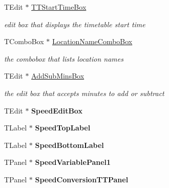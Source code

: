 \begin{DoxyCompactItemize}
T\+Edit $\ast$ \mbox{\hyperlink{class_t_interface_aa3e7a74c49f2afc9c61821f5606b13cd}{T\+T\+Start\+Time\+Box}}
\begin{DoxyCompactList}\small\item\em edit box that displays the timetable start time \end{DoxyCompactList}\item 
\mbox{\label{class_t_interface_a68191596344fa3f2f7c8b4feadb8ab4f}} 
T\+Combo\+Box $\ast$ \mbox{\hyperlink{class_t_interface_a68191596344fa3f2f7c8b4feadb8ab4f}{Location\+Name\+Combo\+Box}}
\begin{DoxyCompactList}\small\item\em the combobox that lists location names \end{DoxyCompactList}\item 
\mbox{\label{class_t_interface_abc16ad27bf676c2533855c4a092f43e4}} 
T\+Edit $\ast$ \mbox{\hyperlink{class_t_interface_abc16ad27bf676c2533855c4a092f43e4}{Add\+Sub\+Mins\+Box}}
\begin{DoxyCompactList}\small\item\em the edit box that accepts minutes to add or subtract \end{DoxyCompactList}\item 
\mbox{\label{class_t_interface_a4369dc729439dc084cf175080e2d0716}} 
T\+Edit $\ast$ {\bfseries Speed\+Edit\+Box}
\item 
\mbox{\label{class_t_interface_a08a62d0894da968f67d86b2f98961f2e}} 
T\+Label $\ast$ {\bfseries Speed\+Top\+Label}
\item 
\mbox{\label{class_t_interface_a6d01dde178e238e13a0762aba5415902}} 
T\+Label $\ast$ {\bfseries Speed\+Bottom\+Label}
\item 
\mbox{\label{class_t_interface_abed4d7ddeffcee538ecab4a508e28119}} 
T\+Panel $\ast$ {\bfseries Speed\+Variable\+Panel1}
\item 
\mbox{\label{class_t_interface_a3216d2f4e638c29d6e531dd8b83aa675}} 
T\+Panel $\ast$ {\bfseries Speed\+Conversion\+T\+T\+Panel}
\item 
\mbox{\label{class_t_interface_a49c4a780cb7d5d5f20bd708013f23f51}} 

\end{DoxyCompactItemize}
